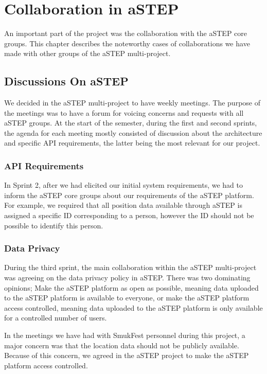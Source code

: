 \chapter{Collaboration in aSTEP}\label{ch:collab}

An important part of the project was the collaboration with the aSTEP core groups. This chapter describes the noteworthy cases of collaborations we have made with other groups of the aSTEP multi-project.

\section{Discussions On aSTEP}
We decided in the aSTEP multi-project to have weekly meetings. The purpose of the meetings was to have a forum for voicing concerns and requests with all aSTEP groups. At the start of the semester, during the first and second sprints, the agenda for each meeting mostly consisted of discussion about the architecture and specific API requirements, the latter being the most relevant for our project.

\subsection{API Requirements}
In Sprint 2, after we had elicited our initial system requirements, we had to inform the aSTEP core groups about our requirements of the aSTEP platform. For example, we required that all position data available through aSTEP is assigned a specific ID corresponding to a person, however the ID should not be possible to identify this person.

\subsection{Data Privacy}

During the third sprint, the main collaboration within the aSTEP multi-project was agreeing on the data privacy policy in aSTEP. There was two dominating opinions; Make the aSTEP platform as open as possible, meaning data uploaded to the aSTEP platform is available to everyone, or make the aSTEP platform access controlled, meaning data uploaded to the aSTEP platform is only available for a controlled number of users.

In the meetings we have had with SmukFest personnel during this project, a major concern was that the location data should not be publicly available. Because of this concern, we agreed in the aSTEP project to make the aSTEP platform access controlled.


